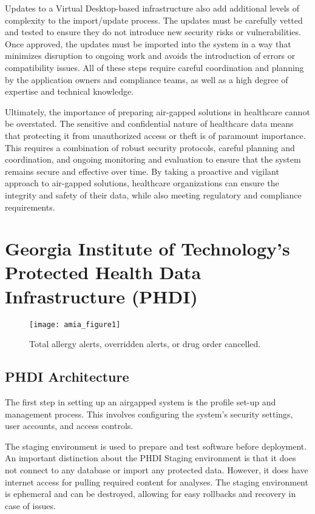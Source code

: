 \documentclass{amia}
\begin{document}
Updates to a Virtual Desktop-based infrastructure also add additional levels of complexity to the import/update process. The updates must be carefully vetted and tested to ensure they do not introduce new security risks or vulnerabilities. Once approved, the updates must be imported into the system in a way that minimizes disruption to ongoing work and avoids the introduction of errors or compatibility issues. All of these steps require careful coordination and planning by the application owners and compliance teams, as well as a high degree of expertise and technical knowledge.

Ultimately, the importance of preparing air-gapped solutions in healthcare cannot be overstated. The sensitive and confidential nature of healthcare data means that protecting it from unauthorized access or theft is of paramount importance. This requires a combination of robust security protocols, careful planning and coordination, and ongoing monitoring and evaluation to ensure that the system remains secure and effective over time. By taking a proactive and vigilant approach to air-gapped solutions, healthcare organizations can ensure the integrity and safety of their data, while also meeting regulatory and compliance requirements.

\section*{Georgia Institute of Technology's Protected Health Data Infrastructure (PHDI)}

\begin{figure}[H]
  \centering
    \texttt{[image: amia\_figure1]}
 \caption{Total allergy alerts, overridden alerts, or drug order cancelled.}
 \label{fig:amia_figure}
\end{figure}

\subsection*{PHDI Architecture}

The first step in setting up an airgapped system is the profile set-up and management process. This involves configuring the system's security settings, user accounts, and access controls.  

The staging environment is used to prepare and test software before deployment. An important distinction about the PHDI Staging environment is that it does not connect to any database or import any protected data. However, it does have internet access for pulling required content for analyses. The staging environment is ephemeral and can be destroyed, allowing for easy rollbacks and recovery in case of issues. 
\end{document}

